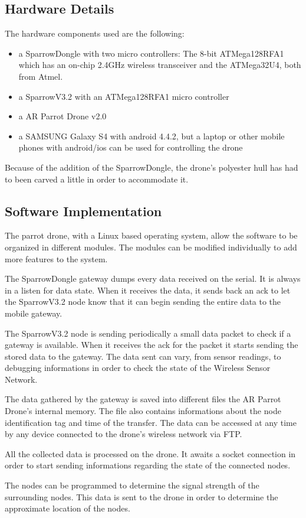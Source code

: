 \label{chap:impl}

 \subsection{Hardware Details}

The hardware components used are the following:
\begin{itemize}

\item a SparrowDongle with two micro controllers: The 8-bit ATMega128RFA1 which has an on-chip 2.4GHz wireless transceiver and the ATMega32U4, both from Atmel.

\item a SparrowV3.2  with an ATMega128RFA1 micro controller 

\item a AR Parrot Drone v2.0

\item a SAMSUNG Galaxy S4 with android 4.4.2, but a laptop or other mobile phones with android/ios can be used for controlling the drone

\end{itemize}

Because of the addition of the SparrowDongle, the drone's polyester hull has had to been carved a little in order to accommodate it.
 

\subsection{Software Implementation}

The parrot drone, with a Linux based operating system, allow the software to be organized in different modules. The modules can be modified individually  to add more features to the system.

The SparrowDongle gateway dumps every data received on the serial. It is always in a listen for data state. When it receives the data, it sends back an ack to let the SparrowV3.2 node know that it can begin sending the entire data to the mobile gateway. 

The SparrowV3.2 node is sending periodically a small data packet to check if a gateway is available. When it receives the ack for the packet it starts sending the stored data to the gateway. The data sent can vary, from sensor readings, to debugging informations in order to check the state of the Wireless Sensor Network.

The data gathered by the gateway is saved into different files the AR Parrot Drone's internal memory. The file also contains informations about the node identification tag and time of the transfer. The data can be accessed at any time by any device connected to the drone's wireless network via FTP.

All the collected data is processed on the drone. It awaits a socket connection in order to start sending informations regarding the state of the connected nodes.

The nodes can be programmed to determine the signal strength of the surrounding nodes. This data is sent to the drone in order to determine the approximate location of the nodes\cite{savarese2001location}.

